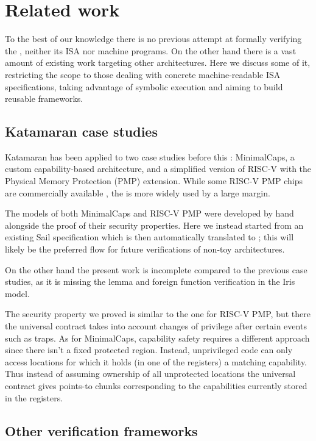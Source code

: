 \chapter{Related work}
\label{ch:related-work}

To the best of our knowledge there is no previous attempt at formally verifying the \msp, neither its ISA nor machine programs. On the other hand there is a vast amount of existing work targeting other architectures. Here we discuss some of it, restricting the scope to those dealing with concrete machine-readable ISA specifications, taking advantage of symbolic execution and aiming to build reusable frameworks.

\section{Katamaran case studies}

Katamaran has been applied to two case studies before this \cite{Huyghebaert2023}: MinimalCaps, a custom capability-based architecture, and a simplified version of RISC-V with the Physical Memory Protection (PMP) extension. While some RISC-V PMP chips are commercially available \cite{XuanTie}, the \msp is more widely used by a large margin.

The \usail models of both MinimalCaps and RISC-V PMP were developed by hand alongside the proof of their security properties. Here we instead started from an existing Sail specification which is then automatically translated to \usail; this will likely be the preferred flow for future verifications of non-toy architectures.

On the other hand the present work is incomplete compared to the previous case studies, as it is missing the lemma and foreign function verification in the Iris model.

The security property we proved is similar to the one for RISC-V PMP, but there the universal contract takes into account changes of privilege after certain events such as traps. As for MinimalCaps, capability safety requires a different approach since there isn't a fixed protected region. Instead, unprivileged code can only access locations for which it holds (in one of the registers) a matching capability. Thus instead of assuming ownership of all unprotected locations the universal contract gives points-to chunks corresponding to the capabilities currently stored in the registers.

\section{Other verification frameworks}

